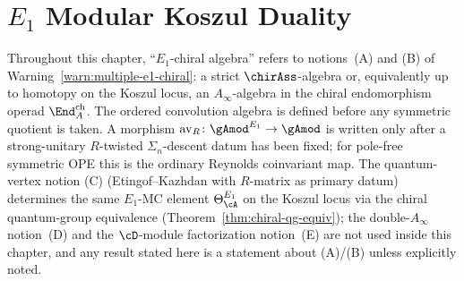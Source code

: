 
\chapter{\texorpdfstring{$E_1$}{E1} Modular Koszul Duality}
\label{chap:e1-modular-koszul}

\providecommand{\SpCh}{\mathrm{Sp}^{\mathrm{ch}}}
\providecommand{\PhiFA}{\Phi^{\mathrm{FA}}}
\providecommand{\HolFA}{\mathrm{HolFA}}

\begin{remark}
\label{rem:e1-modular-notion-fixed}
Throughout this chapter, ``$E_1$-chiral algebra'' refers to
notions~\textup{(A)} and \textup{(B)} of
Warning~\ref{warn:multiple-e1-chiral}: a strict $\chirAss$-algebra
or, equivalently up to homotopy on the Koszul locus, an
$A_\infty$-algebra in the chiral endomorphism operad
$\End^{\mathrm{ch}}_A$. The ordered convolution algebra is defined
before any symmetric quotient is taken. A morphism
$\operatorname{av}_R\colon {\gAmod}^{E_1}\to\gAmod$ is written only
after a strong-unitary $R$-twisted $\Sigma_n$-descent datum has been
fixed; for pole-free symmetric OPE this is the ordinary Reynolds
coinvariant map. The quantum-vertex notion \textup{(C)}
(Etingof--Kazhdan with $R$-matrix as primary datum) determines the
same $E_1$-MC element $\Theta_\cA^{E_1}$ on the Koszul locus via the
chiral quantum-group equivalence
(Theorem~\ref{thm:chiral-qg-equiv}); the double-$A_\infty$
notion~\textup{(D)} and the $\cD$-module factorization
notion~\textup{(E)} are not used inside this chapter, and any
result stated here is a statement about
\textup{(A)}/\textup{(B)} unless explicitly noted.
\end{remark}

